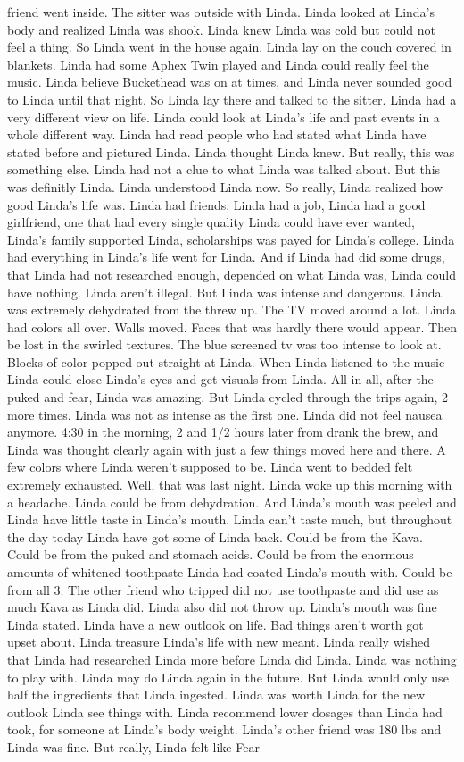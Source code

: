 \documentclass[12pt]{book}
\begin{document}
friend went inside. The sitter was outside with Linda. Linda looked at Linda's body and realized Linda was shook. Linda knew Linda was cold but could not feel a thing. So Linda went in the house again. Linda lay on the couch covered in blankets. Linda had some Aphex Twin played and Linda could really feel the music. Linda believe Buckethead was on at times, and Linda never sounded good to Linda until that night. So Linda lay there and talked to the sitter. Linda had a very different view on life. Linda could look at Linda's life and past events in a whole different way. Linda had read people who had stated what Linda have stated before and pictured Linda. Linda thought Linda knew. But really, this was something else. Linda had not a clue to what Linda was talked about. But this was definitly Linda. Linda understood Linda now. So really, Linda realized how good Linda's life was. Linda had friends, Linda had a job, Linda had a good girlfriend, one that had every single quality Linda could have ever wanted, Linda's family supported Linda, scholarships was payed for Linda's college. Linda had everything in Linda's life went for Linda. And if Linda had did some drugs, that Linda had not researched enough, depended on what Linda was, Linda could have nothing. Linda aren't illegal. But Linda was intense and dangerous. Linda was extremely dehydrated from the threw up. The TV moved around a lot. Linda had colors all over. Walls moved. Faces that was hardly there would appear. Then be lost in the swirled textures. The blue screened tv was too intense to look at. Blocks of color popped out straight at Linda. When Linda listened to the music Linda could close Linda's eyes and get visuals from Linda. All in all, after the puked and fear, Linda was amazing. But Linda cycled through the trips again, 2 more times. Linda was not as intense as the first one. Linda did not feel nausea anymore. 4:30 in the morning, 2 and 1/2 hours later from drank the brew, and Linda was thought clearly again with just a few things moved here and there. A few colors where Linda weren't supposed to be. Linda went to bedded felt extremely exhausted. Well, that was last night. Linda woke up this morning with a headache. Linda could be from dehydration. And Linda's mouth was peeled and Linda have little taste in Linda's mouth. Linda can't taste much, but throughout the day today Linda have got some of Linda back. Could be from the Kava. Could be from the puked and stomach acids. Could be from the enormous amounts of whitened toothpaste Linda had coated Linda's mouth with. Could be from all 3. The other friend who tripped did not use toothpaste and did use as much Kava as Linda did. Linda also did not throw up. Linda's mouth was fine Linda stated. Linda have a new outlook on life. Bad things aren't worth got upset about. Linda treasure Linda's life with new meant. Linda really wished that Linda had researched Linda more before Linda did Linda. Linda was nothing to play with. Linda may do Linda again in the future. But Linda would only use half the ingredients that Linda ingested. Linda was worth Linda for the new outlook Linda see things with. Linda recommend lower dosages than Linda had took, for someone at Linda's body weight. Linda's other friend was 180 lbs and Linda was fine. But really, Linda felt like Fear 
\end{document}
